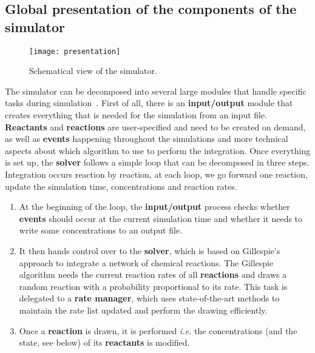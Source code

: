 \graphicspath{{\relativepath/figures/}}

\subsection{Global presentation of the components of the simulator}

\begin{figure}[!ht]
        \centering
        \texttt{[image: presentation]}
	\caption{Schematical view of the simulator.}
	\label{fig:presentation}
\end{figure}

The simulator can be decomposed into several large modules that handle specific tasks during simulation~. First of all, there is an \textbf{input/output} module that creates everything that is needed for the simulation from an input file. \textbf{Reactants} and \textbf{reactions} are user-specified and need to be created on demand, as well as \textbf{events} happening throughout the simulations and more technical aspects about which algorithm to use to perform the integration. Once everything is set up, the \textbf{solver} follows a simple loop that can be decomposed in three steps. Integration occurs reaction by reaction, at each loop, we go forward one reaction, update the simulation time, concentrations and reaction rates.

\begin{enumerate}
	\item At the beginning of the loop, the \textbf{input/output} process checks whether \textbf{events} should occur at the current simulation time and whether it needs to write some concentrations to an output file.
	\item It then hands control over to the \textbf{solver}, which is based on Gillespie's approach to integrate a network of chemical reactions. The Gillespie algorithm needs the current reaction rates of all \textbf{reactions} and draws a random reaction with a probability proportional to its rate. This task is delegated to a \textbf{rate manager}, which uses state-of-the-art methods to maintain the rate list updated and perform the drawing efficiently.
	\item Once a \textbf{reaction} is drawn, it is performed \textit{i.e.} the concentrations (and the state, see below) of its \textbf{reactants} is modified.
\end{enumerate}









